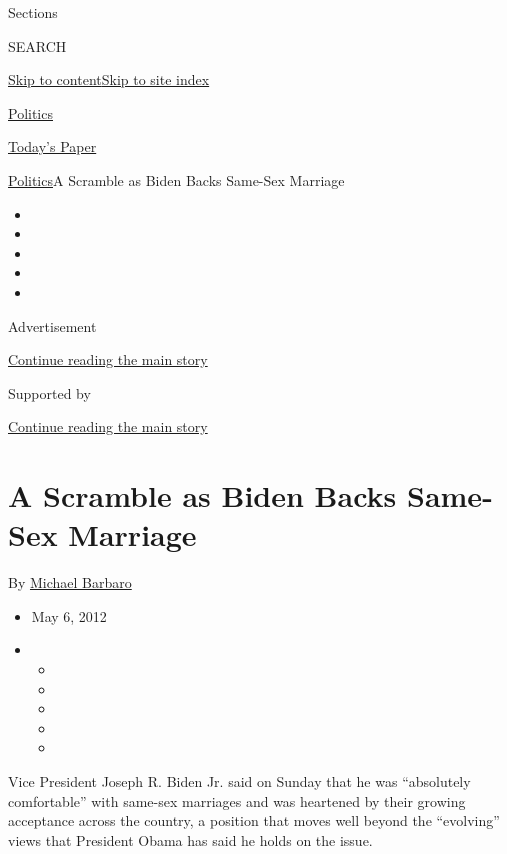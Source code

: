 Sections

SEARCH

\protect\hyperlink{site-content}{Skip to
content}\protect\hyperlink{site-index}{Skip to site index}

\href{https://www.nytimes.com/section/politics}{Politics}

\href{https://myaccount.nytimes.com/auth/login?response_type=cookie\&client_id=vi}{}

\href{https://www.nytimes.com/section/todayspaper}{Today's Paper}

\href{/section/politics}{Politics}\textbar{}A Scramble as Biden Backs
Same-Sex Marriage

\begin{itemize}
\item
\item
\item
\item
\item
\end{itemize}

Advertisement

\protect\hyperlink{after-top}{Continue reading the main story}

Supported by

\protect\hyperlink{after-sponsor}{Continue reading the main story}

\hypertarget{a-scramble-as-biden-backs-same-sex-marriage}{%
\section{A Scramble as Biden Backs Same-Sex
Marriage}\label{a-scramble-as-biden-backs-same-sex-marriage}}

By \href{https://www.nytimes.com/by/michael-barbaro}{Michael Barbaro}

\begin{itemize}
\item
  May 6, 2012
\item
  \begin{itemize}
  \item
  \item
  \item
  \item
  \item
  \end{itemize}
\end{itemize}

Vice President Joseph R. Biden Jr. said on Sunday that he was
``absolutely comfortable'' with same-sex marriages and was heartened by
their growing acceptance across the country, a position that moves well
beyond the ``evolving'' views that President Obama has said he holds on
the issue.

